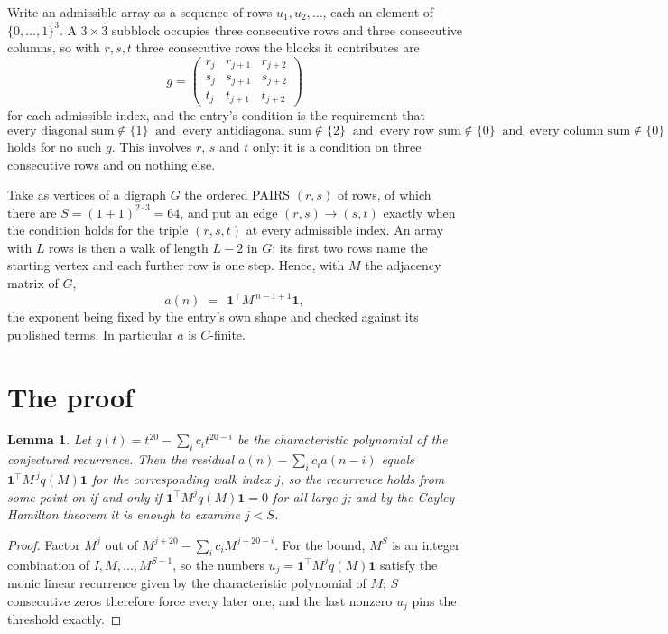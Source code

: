 \documentclass[11pt,a4paper]{article}
\theoremstyle{plain}
\newtheorem{lemma}[theorem]{Lemma}
\theoremstyle{definition}
\begin{document}
Write an admissible array as a sequence of rows $u_1,u_2,\dots$, each an element of
$\{0,\dots,1\}^{3}$. A $3\times3$ subblock occupies three consecutive rows and
three consecutive columns, so with $r,s,t$ three consecutive rows the blocks it
contributes are
\[
g=\begin{pmatrix}r_j&r_{j+1}&r_{j+2}\\ s_j&s_{j+1}&s_{j+2}\\ t_j&t_{j+1}&t_{j+2}\end{pmatrix}
\]
for each admissible index, and the entry's condition is the requirement that
\[
\text{every diagonal sum} \notin \{1\}\ \text{ and }\ \text{every antidiagonal sum} \notin \{2\}\ \text{ and }\ \text{every row sum} \notin \{0\}\ \text{ and }\ \text{every column sum} \notin \{0\}
\]
holds for no such $g$. This involves $r$, $s$ and $t$ only: it is a condition on
three consecutive rows and on nothing else.

Take as vertices of a digraph $G$ the ordered PAIRS $(r,s)$ of rows, of which there are
$S=(1+1)^{2\cdot3}=64$, and put an edge $(r,s)\to(s,t)$ exactly when the condition
holds for the triple $(r,s,t)$ at every admissible index. An array with $L$ rows is then a
walk of length $L-2$ in $G$: its first two rows name the starting vertex and each further
row is one step. Hence, with $M$ the adjacency matrix of $G$,
\[
a(n)\;=\;\,\mathbf{1}^{\!\top}M^{\,n-1+1}\mathbf{1},
\]
the exponent being fixed by the entry's own shape and checked against its published terms.
In particular $a$ is $C$-finite.

\section{The proof}

\begin{lemma}\label{lem:crit}
Let $q(t)=t^{20}-\sum_i c_it^{20-i}$ be the characteristic polynomial of the
conjectured recurrence. Then the residual $a(n)-\sum_ic_ia(n-i)$ equals
$\mathbf{1}^{\!\top}M^{\,j}q(M)\mathbf{1}$ for the corresponding walk index
$j$, so the recurrence holds from some point on if and only if
$\mathbf{1}^{\!\top}M^{j}q(M)\mathbf{1}=0$ for all large $j$; and by the
Cayley--Hamilton theorem it is enough to examine $j<S$.
\end{lemma}

\begin{proof}
Factor $M^{j}$ out of $M^{j+20}-\sum_ic_iM^{j+20-i}$. For the bound, $M^{S}$
is an integer combination of $I,M,\dots,M^{S-1}$, so the numbers
$u_j=\mathbf{1}^{\!\top}M^{j}q(M)\mathbf{1}$ satisfy the monic linear recurrence given by
the characteristic polynomial of $M$; $S$ consecutive zeros therefore force every later one,
and the last nonzero $u_j$ pins the threshold exactly.
\end{proof}
\end{document}
